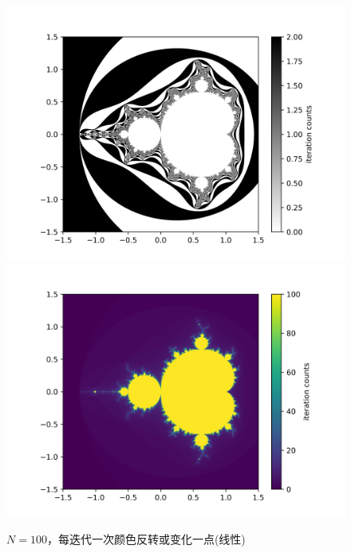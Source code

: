 \documentclass[a4paper]{ctexart}
\begin{document}
\begin{enumerate}
\begin{figure}[H]
	\centering
	\includegraphics[width=.45\textwidth]{./png/man_amazing_n100.png}
	\includegraphics[width=.45\textwidth]{./png/man_color_n100.png}
	\caption{$N=100$，每迭代一次颜色反转或变化一点(线性)}
	\label{color}
\end{figure}


\end{enumerate}
\end{document}
